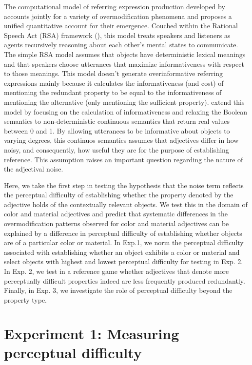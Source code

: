 \documentclass[12pt,letterpaper]{article}
\begin{document}
The computational model of referring expression production developed by \citet{DegenEtAl2020} accounts jointly for a variety of overmodification phenomena and proposes a unified quantitative account for their emergence. Couched within the Rational Speech Act (RSA) framework (\citealt{Goodman2016}), this model treats speakers and listeners as agents recursively reasoning about each other's mental states to communicate. The simple RSA model assumes that objects have deterministic lexical meanings and that speakers choose utterances that maximize informativeness with respect to those meanings. This model doesn't generate overinformative referring expressions mainly because it calculates the informativeness (and cost) of mentioning the redundant property to be equal to the informativeness of mentioning the alternative (only mentioning the sufficient property). \citet{DegenEtAl2020} extend this model by focusing on the calculation of informativeness and relaxing the Boolean semantics to non-deterministic continuous semantics that return real values between 0 and 1. By allowing utterances to be informative about objects to varying degrees, this continuos semantics assumes that adjectives differ in how noisy, and consequently, how useful they are for the purpose of establishing reference. This assumption raises an important question regarding the nature of the adjectival noise. 

Here, we take the first step in testing the hypothesis that the noise term reflects the perceptual difficulty of establishing whether the property denoted by the adjective holds of the contextually relevant objects. We test this in the domain of color and material adjectives and predict that systematic differences in the overmodification patterns observed for color and material adjectives can be explained by a difference in perceptual difficulty of establishing whether objects are of a particular color or material. In Exp.1, we norm the perceptual difficulty associated with establishing whether an object exhibits a color or material and select objects with highest and lowest perceptual difficulty for testing in Exp. 2. In Exp. 2, we test in a reference game whether adjectives that denote more perceptually difficult properties indeed are less frequently produced redundantly. Finally, in Exp. 3, we investigate the role of perceptual difficulty beyond the property type. 

\section{Experiment 1: Measuring perceptual difficulty} 
\end{document}
